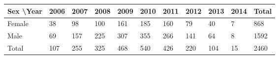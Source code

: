 \begin{center}
\begin{tabular}{l|lllllllll|l}
Sex \textbackslash Year & 2006 & 2007 & 2008 & 2009 & 2010 & 2011 & 2012 & 2013 & 2014 & Total \\ \hline
Female                  & 38   & 98   & 100  & 161  & 185  & 160  & 79   & 40   & 7    & 868   \\
Male                    & 69   & 157  & 225  & 307  & 355  & 266  & 141  & 64   & 8    & 1592  \\ \hline
Total                   & 107  & 255  & 325  & 468  & 540  & 426  & 220  & 104  & 15   & 2460 
\end{tabular}
\end{center}